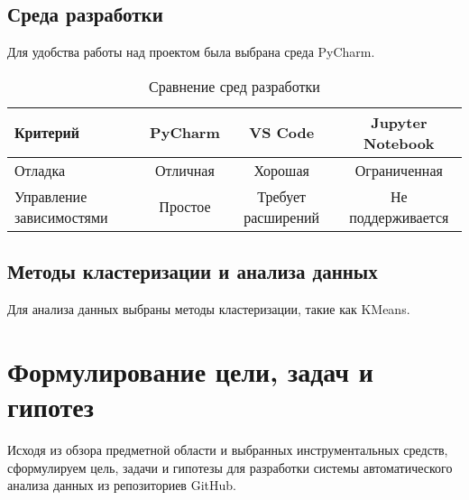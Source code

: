 \subsection{Среда разработки}
Для удобства работы над проектом была выбрана среда PyCharm.

\begin{table}[htbp]
	\centering
	\caption{Сравнение сред разработки}
	\label{tab:ide}
	\begin{tabular}{|l|c|c|c|}
		\hline
		\textbf{Критерий} & \textbf{PyCharm} & \textbf{VS Code} & \textbf{Jupyter Notebook} \\
		\hline
		Отладка & Отличная & Хорошая & Ограниченная \\
		Управление зависимостями & Простое & Требует расширений & Не поддерживается \\
		\hline
	\end{tabular}
\end{table}

\subsection{Методы кластеризации и анализа данных}
Для анализа данных выбраны методы кластеризации, такие как KMeans.

\begin{table}[htbp]
	\centering
	\caption{Сравнение алгоритмов кластеризации}
	\label{tab:clustering}
\end{table}

\section{Формулирование цели, задач и гипотез} \label{ch1:sec5}

Исходя из обзора предметной области и выбранных инструментальных средств, сформулируем цель, задачи и гипотезы для разработки системы автоматического анализа данных из репозиториев GitHub.

